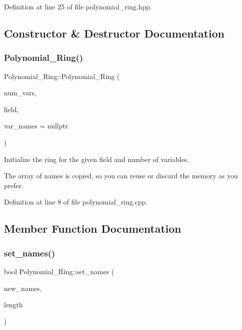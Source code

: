 Definition at line 25 of file polynomial\+\_\+ring.\+hpp.



\subsection{Constructor \& Destructor Documentation}
\mbox{\label{class_polynomial___ring_af62688669a31cb720bb1e90a724daa4f}} 
\subsubsection{\texorpdfstring{Polynomial\+\_\+\+Ring()}{Polynomial\_Ring()}}
{\footnotesize\ttfamily Polynomial\+\_\+\+Ring\+::\+Polynomial\+\_\+\+Ring (\begin{DoxyParamCaption}\item[{N\+V\+A\+R\+\_\+\+T\+Y\+PE}]{num\+\_\+vars,  }\item[{\hyperlink{class_prime___field}{Prime\+\_\+\+Field} \&}]{field,  }\item[{string $\ast$}]{var\+\_\+names = {\ttfamily nullptr} }\end{DoxyParamCaption})}



Initialize the ring for the given field and number of variables. 

The array of names is copied, so you can reuse or discard the memory as you prefer. 

Definition at line 8 of file polynomial\+\_\+ring.\+cpp.



\subsection{Member Function Documentation}
\mbox{\label{class_polynomial___ring_ae59dcd21a16ffccc7b32e3c2f898b6f3}} 
\subsubsection{\texorpdfstring{set\+\_\+names()}{set\_names()}}
{\footnotesize\ttfamily bool Polynomial\+\_\+\+Ring\+::set\+\_\+names (\begin{DoxyParamCaption}\item[{string $\ast$}]{new\+\_\+names,  }\item[{N\+V\+A\+R\+\_\+\+T\+Y\+PE}]{length }\end{DoxyParamCaption})}



